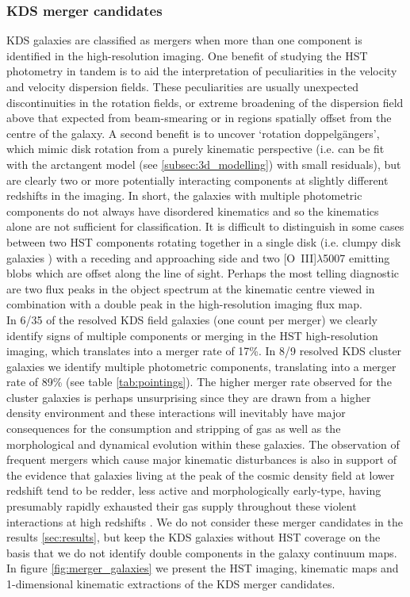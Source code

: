 \documentclass[fleqn,usenatbib]{mn2e}
\begin{document}
\subsubsection{KDS merger candidates}\label{subsubsection:merger_candidates}
KDS galaxies are classified as mergers when more than one component is identified in the high-resolution imaging.  
One benefit of studying the HST photometry in tandem is to aid the interpretation of peculiarities in the velocity and velocity dispersion fields.
These peculiarities are usually unexpected discontinuities in the rotation fields, or extreme broadening of the dispersion field above that expected from beam-smearing or in regions spatially offset from the centre of the galaxy.
A second benefit is to uncover `rotation doppelg{\"a}ngers', which mimic disk rotation from a purely kinematic perspective (i.e. can be fit with the arctangent model (see \cref{subsec:3d_modelling}) with small residuals), but are clearly two or more potentially interacting components at slightly different redshifts in the imaging.
In short, the galaxies with multiple photometric components do not always have disordered kinematics and so the kinematics alone are not sufficient for classification.
It is difficult to distinguish in some cases between two HST components rotating together in a single disk (i.e. clumpy disk galaxies \citep[e.g.][]{Elmegreen2004,Bournaud2007}) with a receding and approaching side and two [O~{\sc III}]$\lambda$5007 emitting blobs which are offset along the line of sight.
Perhaps the most telling diagnostic are two flux peaks in the object spectrum at the kinematic centre viewed in combination with a double peak in the high-resolution imaging flux map. \\

In 6/35 of the resolved KDS field galaxies (one count per merger) we clearly identify signs of multiple components or merging in the HST high-resolution imaging, which translates into a merger rate of 17\%.
In 8/9 resolved KDS cluster galaxies we identify multiple photometric components, translating into a merger rate of 89\%  (see table \ref{tab:pointings}).
The higher merger rate observed for the cluster galaxies is perhaps unsurprising since they are drawn from a higher density environment and these interactions will inevitably have major consequences for the consumption and stripping of gas as well as the morphological and dynamical evolution within these galaxies.
The observation of frequent mergers which cause major kinematic disturbances is also in support of the evidence that galaxies living at the peak of the cosmic density field at lower redshift tend to be redder, less active and morphologically early-type, having presumably rapidly exhausted their gas supply throughout these violent interactions at high redshifts \citep[e.g.][]{Steidel1998,White2007,Kodama2007,Zheng2009}.
We do not consider these merger candidates in the results \cref{sec:results}, but keep the KDS galaxies without HST coverage on the basis that we do not identify double components in the galaxy continuum maps. 
In figure \ref{fig:merger_galaxies} we present the HST imaging, kinematic maps and 1-dimensional kinematic extractions of the KDS merger candidates.
\end{document}
